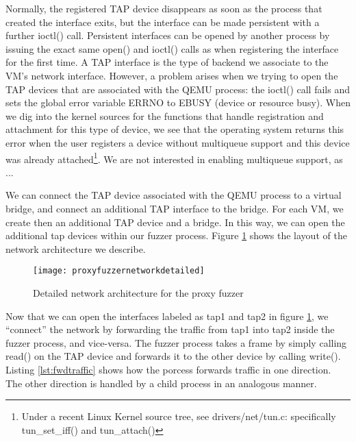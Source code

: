 Normally, the registered TAP device disappears as soon as the process that created the interface exits, but
the interface can be made persistent with a further ioctl() call. Persistent interfaces can be opened
by another process by issuing the exact same open() and ioctl() calls as when registering the interface
for the first time.
A TAP interface is the type of backend we associate to the VM's network interface. However, a problem arises
when we trying to open the TAP devices that are associated with the QEMU process: the ioctl() call
fails and sets the global error variable ERRNO to EBUSY (device or resource busy). When
we dig into the kernel sources for the functions that handle registration and attachment for this type of device,
we see that the operating system returns  this error when the user registers a device without multiqueue support and this device was already
attached\footnote{Under a recent Linux Kernel source tree, see drivers/net/tun.c: specifically tun\_set\_iff() and tun\_attach() }.
We are not interested in enabling multiqueue support, as ...

We can connect the TAP device associated with the QEMU process to a virtual bridge, and connect an additional TAP interface to the bridge.
For each VM, we create then an additional TAP device and a bridge. In this way, we can open the additional tap devices within our fuzzer
process. Figure \ref{fig:networkdetailed} shows the layout of the network architecture we describe.

\begin{figure}[h]
  \centering
  \texttt{[image: proxyfuzzernetworkdetailed]}
  \caption[Proxy fuzzer network architecture]{Detailed network architecture for the proxy fuzzer}
  \label{fig:networkdetailed}
\end{figure}

Now that we can open the interfaces labeled as tap1 and tap2 in figure \ref{fig:networkdetailed}, we ``connect'' the
network by forwarding the traffic from tap1 into tap2 inside the fuzzer process, and vice-versa. The fuzzer
process takes a frame by simply calling read() on the TAP device and forwards it to the other device by calling write().
Listing \ref{lst:fwdtraffic} shows how the porcess forwards traffic in one direction. The other direction is handled by a
child process in an analogous manner.

